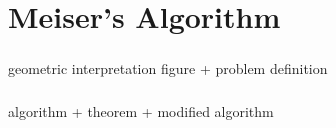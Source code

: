 \section{Meiser's Algorithm}
\begin{frame}\frametitle{\insertsection}\justifying
geometric interpretation figure + problem definition
\end{frame}
\begin{frame}\frametitle{\insertsection}\justifying
algorithm + theorem + modified algorithm
\end{frame}
